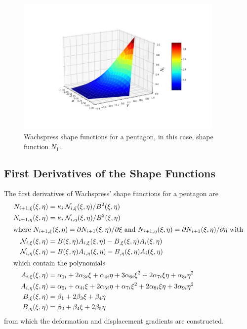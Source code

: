 \begin{figure}
	\centering
	\includegraphics[width=0.9\textwidth]{figures/shapeFunction.jpg}
	\caption{Wachspress shape functions for a pentagon, in this case, shape function $N_1$.}
	\label{figShapeFuntion}
\end{figure}

\subsection{First Derivatives of the Shape Functions}

The first derivatives of Wachspress' shape functions for a pentagon are
\begin{subequations}
    \label{shapeFunctionGradients}
	\begin{align}
	N_{i+1,\xi} (\xi, \eta) & = \kappa_i \, \mathcal{N}_{i,\xi}(\xi, \eta) /
	B^2(\xi, \eta) \\
	N_{i+1,\eta} (\xi, \eta) & = \kappa_i \, \mathcal{N}_{i,\eta}(\xi, \eta) /
	B^2(\xi, \eta) \\
	\intertext{where $N_{i+1,\xi}  (\xi, \eta) = \partial N_{i+1} (\xi, \eta) / \partial \xi$ and $N_{i+1,\eta} (\xi, \eta) = \partial N_{i+1} (\xi, \eta) / \partial \eta$ with}
	\mathcal{N}_{i,\xi} (\xi,\eta) & = B(\xi, \eta) A_{i,\xi} (\xi, \eta) -
	B_{,\xi} (\xi, \eta) A_i (\xi, \eta) \\
	\mathcal{N}_{i,\eta} (\xi,\eta) & = B(\xi, \eta) A_{i,\eta} (\xi, \eta) - 
	B_{,\eta} (\xi, \eta) A_i (\xi, \eta) \\
	\intertext{which contain the polynomials}
	A_{i,\xi} (\xi, \eta) & = \alpha_{1i} + 2 \alpha_{3i} \xi + \alpha_{4i} \eta +
	3 \alpha_{6i} \xi^2 + 2 \alpha_{7i} \xi \eta + \alpha_{8i} \eta^2
	\label{shapeFnGradXiNum} \\
	A_{i,\eta} (\xi, \eta) & = \alpha_{2i} + \alpha_{4i} \xi + 2 \alpha_{5i} \eta + 
	\alpha_{7i} \xi^2 + 2 \alpha_{8i} \xi\eta + 3 \alpha_{9i} \eta^2 
	\label{shapeFnGradEtaNum} \\
	B_{,\xi} (\xi, \eta) & = \beta_1 + 2 \beta_3 \xi + \beta_4 \eta
	\label{shapeFnGradXiDenom} \\
	B_{,\eta} (\xi, \eta) & = \beta_2 + \beta_4 \xi + 2 \beta_5 \eta 
	\label{shapeFnGradEtaDenom}
	\end{align}
\end{subequations}
from which the deformation and displacement gradients are constructed.


